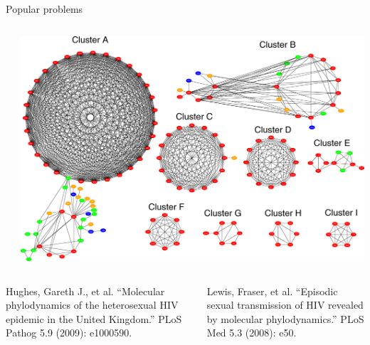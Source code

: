 \documentclass{beamer}
\begin{document}
\begin{frame}{Popular problems}
\begin{columns}
\begin{column}{0.5\textwidth}
        \end{column}
        \begin{column}{0.5\textwidth}
            \includegraphics[width=\textwidth]{lewis2008episodic-f2}
        \end{column}
    \end{columns}
    \begin{columns}
        \begin{column}{0.5\textwidth}
            \tiny
            Hughes, Gareth J., et al. ``Molecular phylodynamics of the heterosexual HIV epidemic in the United Kingdom.'' PLoS Pathog 5.9 (2009): e1000590.
        \end{column}
        \begin{column}{0.5\textwidth}
            \tiny
            Lewis, Fraser, et al. ``Episodic sexual transmission of HIV revealed by molecular phylodynamics.'' PLoS Med 5.3 (2008): e50.
        \end{column}
    \end{columns}
\end{frame}
\end{document}
